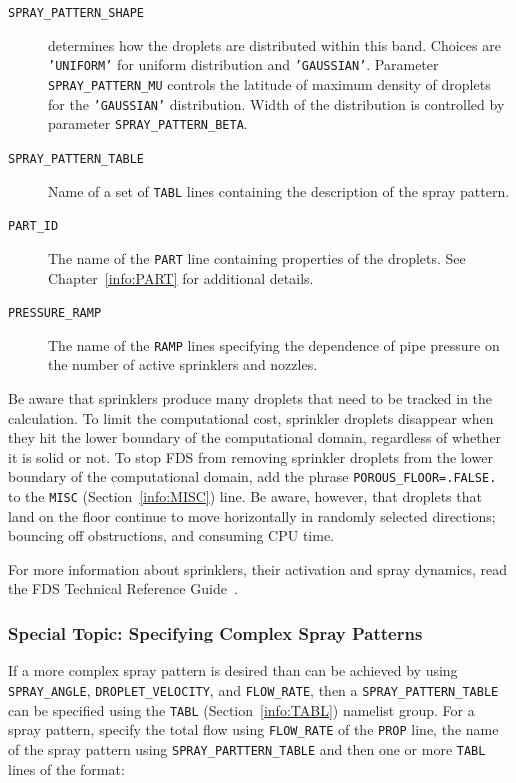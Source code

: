 \documentclass[11pt]{book}
\newcommand{\ct}{\tt\small}
\begin{document}
\begin{description}
\item[{\ct SPRAY\_PATTERN\_SHAPE}] determines how the droplets are distributed within this band.
Choices are {\ct 'UNIFORM'} for uniform distribution and {\ct 'GAUSSIAN'}. Parameter {\ct SPRAY\_PATTERN\_MU} controls the latitude of
maximum density of droplets for the {\ct 'GAUSSIAN'} distribution. Width of the distribution is controlled by parameter {\ct SPRAY\_PATTERN\_BETA}.
\item[{\ct SPRAY\_PATTERN\_TABLE}] Name of a set of {\ct TABL} lines containing the description of the spray pattern.
\item[{\ct PART\_ID}] The name of the {\ct PART} line containing properties of the droplets.
See Chapter~\ref{info:PART} for additional details.
\item[{\ct PRESSURE\_RAMP}] The name of the {\ct RAMP} lines specifying the dependence of pipe pressure on the
number of active sprinklers and nozzles.
\end{description}

\noindent
Be aware that sprinklers produce many droplets that need to be
tracked in the calculation. To limit the computational cost, sprinkler droplets disappear when they hit the
lower boundary of the computational domain, regardless of whether it is solid
or not. To stop FDS from removing sprinkler droplets from the lower boundary of the computational domain,
add the phrase {\ct POROUS\_FLOOR=.FALSE.} to the {\ct MISC} (Section~\ref{info:MISC}) line. Be aware, however, that
droplets that land on the floor continue to move horizontally in randomly selected
directions; bouncing off obstructions, and consuming CPU time.

For more information about sprinklers, their activation and spray dynamics, read the FDS
Technical Reference Guide~\cite{FDS_Math_Guide}.


\subsubsection{Special Topic: Specifying Complex Spray Patterns}
\label{info:spraypattern}

If a more complex spray pattern is desired than can be achieved by using {\ct SPRAY\_ANGLE}, {\ct DROPLET\_VELOCITY},
and {\ct FLOW\_RATE}, then a {\ct SPRAY\_PATTERN\_TABLE} can be specified using the {\ct TABL} (Section~\ref{info:TABL})
namelist group.  For a spray pattern, specify the total flow using {\ct FLOW\_RATE} of the {\ct PROP} line, the name of the spray pattern using
{\ct SPRAY\_PARTTERN\_TABLE} and then one or more {\ct TABL} lines of the format:
\end{document}
